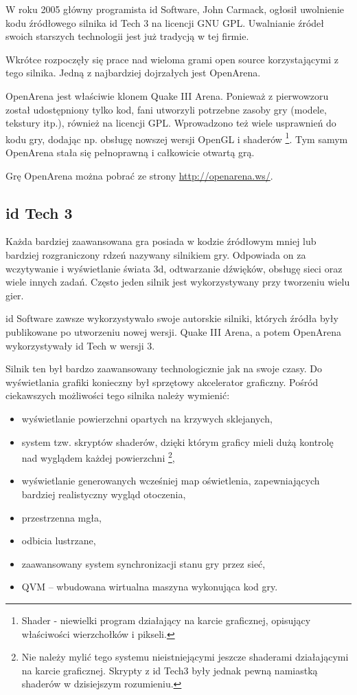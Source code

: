 W roku 2005 główny programista id Software, John Carmack, ogłosił uwolnienie
kodu źródłowego silnika id Tech 3 na licencji GNU GPL. Uwalnianie źródeł swoich
starszych technologii jest już tradycją w tej firmie.

Wkrótce rozpoczęły się prace nad wieloma grami open source korzystającymi
z tego silnika. Jedną z najbardziej dojrzałych jest OpenArena.

OpenArena jest właściwie klonem Quake III Arena. Ponieważ z pierwowzoru został
udostępniony tylko kod, fani utworzyli potrzebne zasoby gry (modele, tekstury itp.),
również na licencji GPL. Wprowadzono też wiele usprawnień do kodu gry,
dodając np. obsługę nowszej wersji OpenGL i shaderów \footnote{Shader - niewielki program
  działający na karcie graficznej, opisujący właściwości wierzchołków
  i pikseli.}. Tym samym OpenArena stała się pełnoprawną
i całkowicie otwartą grą.

Grę OpenArena można pobrać ze strony \url{http://openarena.ws/}.

\subsection{id Tech 3}
\label{ssec:idTech}

Każda bardziej zaawansowana gra posiada w kodzie źródłowym mniej lub bardziej
rozgraniczony rdzeń nazywany silnikiem gry. Odpowiada on za wczytywanie
i wyświetlanie świata 3d, odtwarzanie dźwięków, obsługę sieci oraz wiele
innych zadań. Często jeden silnik jest wykorzystywany przy tworzeniu wielu gier.

id Software zawsze wykorzystywało swoje autorskie silniki, których źródła były
publikowane po utworzeniu nowej wersji. Quake III Arena, a potem OpenArena
wykorzystywały id Tech w wersji 3.

Silnik ten był bardzo zaawansowany technologicznie jak na swoje czasy. Do wyświetlania
grafiki konieczny był sprzętowy akcelerator graficzny. Pośród ciekawszych
możliwości tego silnika należy wymienić:
\begin{itemize}
\item wyświetlanie powierzchni opartych na krzywych sklejanych,
\item system tzw. skryptów shaderów, dzięki którym graficy mieli dużą kontrolę
  nad wyglądem każdej powierzchni \footnote {Nie należy mylić tego systemu nieistniejącymi
    jeszcze shaderami działającymi na karcie graficznej. Skrypty z id Tech3 były jednak pewną
    namiastką shaderów w dzisiejszym rozumieniu.},
\item wyświetlanie generowanych wcześniej map oświetlenia, zapewniających bardziej
  realistyczny wygląd otoczenia,
\item przestrzenna mgła,
\item odbicia lustrzane,
\item zaawansowany system synchronizacji stanu gry przez sieć,
\item QVM -- wbudowana wirtualna maszyna wykonująca kod gry.
\end{itemize}

